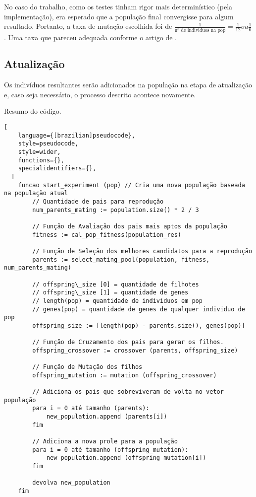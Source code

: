 No caso do trabalho, como os testes tinham rigor mais determinístico (pela implementação), era esperado que a população final convergisse para algum resultado. Portanto, a taxa de mutação escolhida foi de $\frac{1}{\text{nº de individuos na pop}} = \frac{1}{12} ou \frac{1}{6}$. Uma taxa que pareceu adequada conforme o artigo de \citet{haupt00:mutationprob}.

\pagebreak

\subsection{Atualização}
\label{sec:ag-atualizacao}

Os indivíduos resultantes serão adicionados na população na etapa de atualização  e, caso seja necessário, o processo descrito acontece novamente.

\begin{programruledcaption}{Resumo do código. \label{prog:resumo_AG}}
  \begin{lstlisting}[
    language={[brazilian]pseudocode},
    style=pseudocode,
    style=wider,
    functions={},
    specialidentifiers={},
  ]
    funcao start_experiment (pop) // Cria uma nova população baseada na população atual
        // Quantidade de pais para reprodução
        num_parents_mating := population.size() * 2 / 3
	
	    // Função de Avaliação dos pais mais aptos da população
	    fitness := cal_pop_fitness(population_res)
	
	    // Função de Seleção dos melhores candidatos para a reprodução
	    parents := select_mating_pool(population, fitness, num_parents_mating)
	
	    // offspring\_size [0] = quantidade de filhotes
	    // offspring\_size [1] = quantidade de genes
	    // length(pop) = quantidade de individuos em pop
	    // genes(pop) = quantidade de genes de qualquer individuo de pop
	    offspring_size := [length(pop) - parents.size(), genes(pop)]
	    
	    // Função de Cruzamento dos pais para gerar os filhos.
	    offspring_crossover := crossover (parents, offspring_size)

	    // Função de Mutação dos filhos
	    offspring_mutation := mutation (offspring_crossover)
	    
	    // Adiciona os pais que sobreviveram de volta no vetor população
	    para i = 0 até tamanho (parents):
		    new_population.append (parents[i])
		fim
		    
		// Adiciona a nova prole para a população
	    para i = 0 até tamanho (offspring_mutation):
		    new_population.append (offspring_mutation[i])
		fim

	    devolva new_population
    fim
  \end{lstlisting}
\end{programruledcaption}